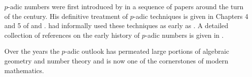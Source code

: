  $p$-adic numbers were first
introduced by {\Hensel} in a sequence of papers
\cite{Hensel97,Hensel02,Hensel04,Hensel05a,Hensel09} around the turn
of the century.  His definitive treatment of $p$-adic techniques is
given in Chapters 4 and 5 of \cite{Hensel13} and \cite{Hensel18}.
{\Hensel} had informally used these techniques as early as
\cite{Hensel87,Hensel88}.  A detailed collection of references on the
early history of $p$-adic numbers is given in \cite{Dickson23}.

Over the years the $p$-adic outlook has permeated large portions of
algebraic geometry and number theory and is now one of the
cornerstones of modern mathematics.

\normalsize
